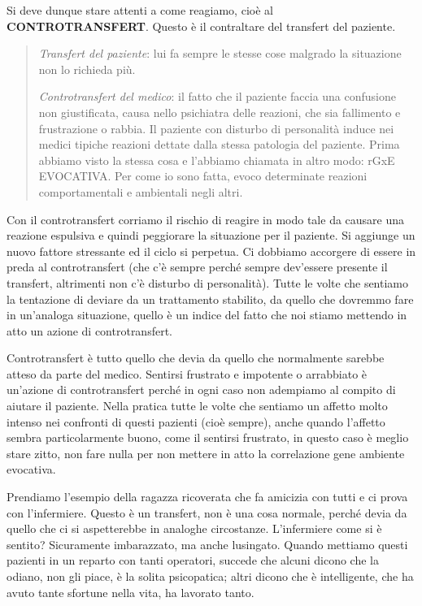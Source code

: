 \documentclass[]{article}
\begin{document}
Si deve dunque stare attenti a come reagiamo, cioè al
\textbf{CONTROTRANSFERT}. Questo è il contraltare del transfert del
paziente.

\begin{quote}
\emph{Transfert del paziente}: lui fa sempre le stesse cose malgrado la
situazione non lo richieda più.

\emph{Controtransfert del medico}: il fatto che il paziente faccia una
confusione non giustificata, causa nello psichiatra delle reazioni, che
sia fallimento e frustrazione o rabbia. Il paziente con disturbo di
personalità induce nei medici tipiche reazioni dettate dalla stessa
patologia del paziente. Prima abbiamo visto la stessa cosa e l'abbiamo
chiamata in altro modo: rGxE EVOCATIVA. Per come io sono fatta, evoco
determinate reazioni comportamentali e ambientali negli altri.
\end{quote}

Con il controtransfert corriamo il rischio di reagire in modo tale da
causare una reazione espulsiva e quindi peggiorare la situazione per il
paziente. Si aggiunge un nuovo fattore stressante ed il ciclo si
perpetua. Ci dobbiamo accorgere di essere in preda al controtransfert
(che c'è sempre perché sempre dev'essere presente il transfert,
altrimenti non c'è disturbo di personalità). Tutte le volte che sentiamo
la tentazione di deviare da un trattamento stabilito, da quello che
dovremmo fare in un'analoga situazione, quello è un indice del fatto che
noi stiamo mettendo in atto un azione di controtransfert.

Controtransfert è tutto quello che devia da quello che normalmente
sarebbe atteso da parte del medico. Sentirsi frustrato e impotente o
arrabbiato è un'azione di controtransfert perché in ogni caso non
adempiamo al compito di aiutare il paziente. Nella pratica tutte le
volte che sentiamo un affetto molto intenso nei confronti di questi
pazienti (cioè sempre), anche quando l'affetto sembra particolarmente
buono, come il sentirsi frustrato, in questo caso è meglio stare zitto,
non fare nulla per non mettere in atto la correlazione gene ambiente
evocativa.

Prendiamo l'esempio della ragazza ricoverata che fa amicizia con tutti e
ci prova con l'infermiere. Questo è un transfert, non è una cosa
normale, perché devia da quello che ci si aspetterebbe in analoghe
circostanze. L'infermiere come si è sentito? Sicuramente imbarazzato, ma
anche lusingato. Quando mettiamo questi pazienti in un reparto con tanti
operatori, succede che alcuni dicono che la odiano, non gli piace, è la
solita psicopatica; altri dicono che è intelligente, che ha avuto tante
sfortune nella vita, ha lavorato tanto.
\end{document}
